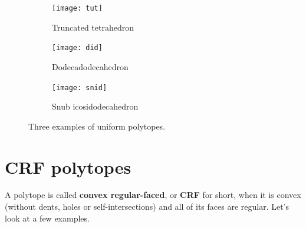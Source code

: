 \documentclass{article}
\begin{document}
\begin{figure}[h]
\centering
\begin{subfigure}{.33333\textwidth}
  \centering
  \texttt{[image: tut]}
  \caption{Truncated tetrahedron}
  \label{fig:tut}
\end{subfigure}%
\begin{subfigure}{.33333\textwidth}
  \centering
  \texttt{[image: did]}
  \caption{Dodecadodecahedron}
  \label{fig:did}
\end{subfigure}%
\begin{subfigure}{.33333\textwidth}
  \centering
  \texttt{[image: snid]}
  \caption{Snub icosidodecahedron}
  \label{fig:snid}
\end{subfigure}%
\caption{Three examples of uniform polytopes.}
\label{fig:uniforms3D}
\end{figure}

\section{CRF polytopes}
A polytope is called \textbf{convex regular-faced}, or \textbf{CRF} for short, when it is convex (without dents, holes or self-intersections) and all of its faces are regular. Let's look at a few examples.
\end{document}
